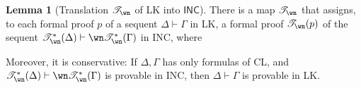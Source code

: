 \documentclass[a4paper]{article}
\theoremstyle{definition}
\theoremstyle{theorem}
\newtheorem{lemma}[definition]{Lemma}
\theoremstyle{remark}
\begin{document}
\begin{lemma}[Translation $\mathscr{T}_{\wn}$ of \textsf{LK} into $\textsf{INC}$]
\label{LemTranslationOfLKIntoILK_mu}
There is a map $\mathscr{T}_{\wn}$ that assigns, to each formal proof $p$ of a sequent $\Delta \vdash \Gamma$ in \textsf{LK}, a formal proof $\mathscr{T}_{\wn}(p)$ of the sequent $\mathscr{T}_{\wn}^\ast(\Delta) \vdash \wn \mathscr{T}_{\wn}^\ast(\Gamma)$ in \textsf{INC}, where

Moreover, it is conservative: If $\Delta, \Gamma$ has only formulas of CL, and $\mathscr{T}_\wn^\ast(\Delta) \vdash \wn \mathscr{T}_\wn^\ast(\Gamma)$ is provable in \textsf{INC}, then $\Delta \vdash \Gamma$ is provable in \textsf{LK}.
\end{lemma}
\end{document}
